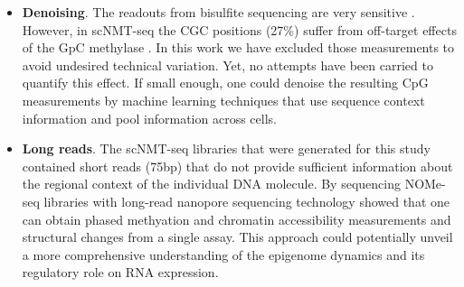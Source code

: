 \begin{itemize}
	\item \textbf{Denoising}. The readouts from bisulfite sequencing are very sensitive \cite{XX}. However, in scNMT-seq the CGC positions (27\%) suffer from off-target effects of the GpC methylase \cite{Kelly2012}. In this work we have excluded those measurements to avoid undesired technical variation. Yet, no attempts have been carried to quantify this effect. If small enough, one could denoise the resulting CpG measurements by machine learning techniques that use sequence context information and pool information across cells.

	\item \textbf{Long reads}. The scNMT-seq libraries that were generated for this study contained short reads (75bp) that do not provide sufficient information about the regional context of the individual DNA molecule. By sequencing NOMe-seq libraries with long-read nanopore sequencing technology \cite{Lee2018} showed that one can obtain phased methyation and chromatin accessibility measurements and structural changes from a single assay. This approach could potentially unveil a more comprehensive understanding of the epigenome dynamics and its regulatory role on RNA expression.

\end{itemize}



